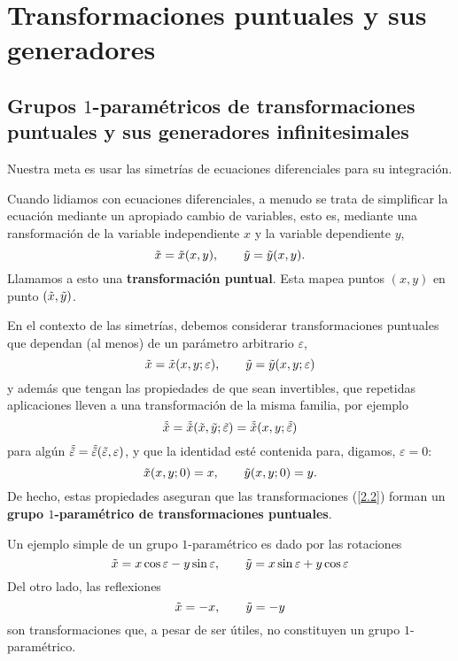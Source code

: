 \chapter{Transformaciones puntuales y sus generadores}
\section{Grupos $1$-paramétricos de transformaciones puntuales y sus generadores infinitesimales}
Nuestra meta es usar las simetrías de ecuaciones diferenciales para su integración.

Cuando lidiamos con ecuaciones diferenciales, a menudo se trata de simplificar la ecuación mediante un apropiado cambio de variables, esto es, mediante una ransformación de la variable independiente $x$ y la variable dependiente $y$,
\begin{equation}\label{2.1}
    \Tilde{x}=\Tilde{x}(x,y),\qquad \Tilde{y}=\Tilde{y}(x,y).
\end{equation}
Llamamos a esto una \textbf{transformación puntual}. Esta mapea puntos $(x,y)$ en punto $(\Tilde{x},\Tilde{y})$.

En el contexto de las simetrías, debemos considerar transformaciones puntuales que dependan (al menos) de un parámetro arbitrario $\varepsilon$,
\begin{equation}\label{2.2}
    \Tilde{x}=\Tilde{x}(x,y;\varepsilon),\qquad \Tilde{y}=\Tilde{y}(x,y;\varepsilon)
\end{equation}
y además que tengan las propiedades de que sean invertibles, que repetidas aplicaciones lleven a una transformación de la misma familia, por ejemplo
\begin{equation}
    \Tilde{\Tilde{x}}=\Tilde{\Tilde{x}}(\Tilde{x},\Tilde{y};\Tilde{\varepsilon})=\Tilde{\Tilde{x}}(x,y;\Tilde{\Tilde{\varepsilon}})
\end{equation}
para algún $\Tilde{\Tilde{\varepsilon}}=\Tilde{\Tilde{\varepsilon}}(\Tilde{\varepsilon},\varepsilon)$, y que la identidad esté contenida para, digamos, $\varepsilon=0$:
\begin{equation}
    \Tilde{x}(x,y;0)=x,\qquad \Tilde{y}(x,y;0)=y.
\end{equation}
De hecho, estas propiedades aseguran que las transformaciones (\ref{2.2}) forman un \textbf{grupo $1$-paramétrico de transformaciones puntuales}.

Un ejemplo simple de un grupo $1$-paramétrico es dado por las rotaciones
\begin{equation}\label{2.5}
    \Tilde{x}=x\cos\varepsilon - y\sin\varepsilon,\qquad \Tilde{y}=x\sin\varepsilon + y\cos\varepsilon
\end{equation}
Del otro lado, las reflexiones
\begin{equation}
    \Tilde{x}=-x,\qquad \Tilde{y}=-y
\end{equation}
son transformaciones que, a pesar de ser útiles, no constituyen un grupo $1$-paramétrico.

